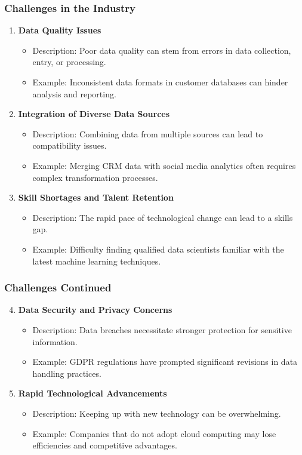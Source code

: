 \documentclass{beamer}
\begin{document}
\begin{frame}[fragile]
    \frametitle{Challenges in the Industry}
    \begin{enumerate}
        \item \textbf{Data Quality Issues} 
        \begin{itemize}
            \item Description: Poor data quality can stem from errors in data collection, entry, or processing.
            \item Example: Inconsistent data formats in customer databases can hinder analysis and reporting.
        \end{itemize}

        \item \textbf{Integration of Diverse Data Sources} 
        \begin{itemize}
            \item Description: Combining data from multiple sources can lead to compatibility issues.
            \item Example: Merging CRM data with social media analytics often requires complex transformation processes.
        \end{itemize}

        \item \textbf{Skill Shortages and Talent Retention}
        \begin{itemize}
            \item Description: The rapid pace of technological change can lead to a skills gap.
            \item Example: Difficulty finding qualified data scientists familiar with the latest machine learning techniques.
        \end{itemize}
    \end{enumerate}
\end{frame}

\begin{frame}[fragile]
    \frametitle{Challenges Continued}
    \begin{enumerate}
        \setcounter{enumi}{3}
        \item \textbf{Data Security and Privacy Concerns}
        \begin{itemize}
            \item Description: Data breaches necessitate stronger protection for sensitive information.
            \item Example: GDPR regulations have prompted significant revisions in data handling practices.
        \end{itemize}

        \item \textbf{Rapid Technological Advancements}
        \begin{itemize}
            \item Description: Keeping up with new technology can be overwhelming.
            \item Example: Companies that do not adopt cloud computing may lose efficiencies and competitive advantages.
        \end{itemize}
    \end{enumerate}
\end{frame}
\end{document}
